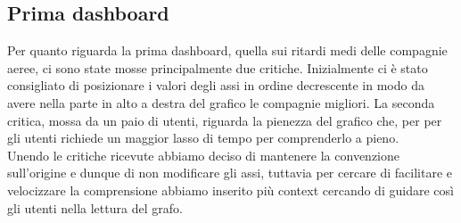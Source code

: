 \documentclass[12pt]{article}
\begin{document}
\subsection{Prima dashboard}
Per quanto riguarda la prima dashboard, quella sui ritardi medi delle compagnie aeree, ci sono state mosse principalmente due critiche. Inizialmente ci è stato consigliato di posizionare i valori degli assi in ordine decrescente in modo da avere nella parte in alto a destra del grafico le compagnie migliori. La seconda critica, mossa da un paio di utenti, riguarda la pienezza del grafico che, per per gli utenti richiede un maggior lasso di tempo per comprenderlo a pieno.\\
Unendo le critiche ricevute abbiamo deciso di mantenere la convenzione sull'origine e dunque di non modificare gli assi, tuttavia per cercare di facilitare e velocizzare la comprensione abbiamo inserito più context cercando di guidare così gli utenti nella lettura del grafo.
\end{document}
